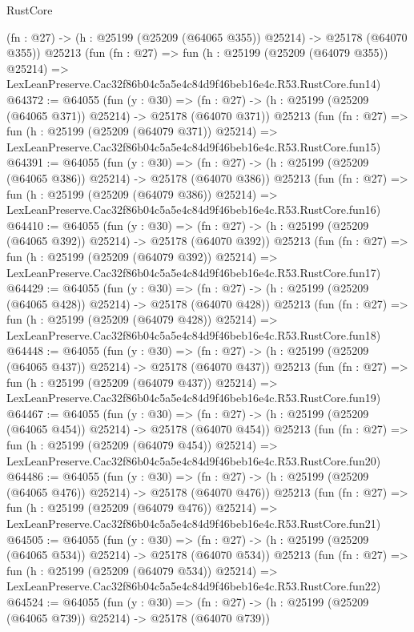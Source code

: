 \begin{lexlean}{RustCore}
\begin{coremodule}
    (fn : @27) -> (h : @25199 (@25209 (@64065 @355)) @25214) -> @25178 (@64070 @355))
    @25213
    (fun (fn : @27) =>
    fun (h : @25199 (@25209 (@64079 @355)) @25214) =>
    LexLeanPreserve.Cac32f86b04c5a5e4c84d9f46beb16e4c.R53.RustCore.fun14)
@64372 := @64055
    (fun (y : @30) =>
    (fn : @27) -> (h : @25199 (@25209 (@64065 @371)) @25214) -> @25178 (@64070 @371))
    @25213
    (fun (fn : @27) =>
    fun (h : @25199 (@25209 (@64079 @371)) @25214) =>
    LexLeanPreserve.Cac32f86b04c5a5e4c84d9f46beb16e4c.R53.RustCore.fun15)
@64391 := @64055
    (fun (y : @30) =>
    (fn : @27) -> (h : @25199 (@25209 (@64065 @386)) @25214) -> @25178 (@64070 @386))
    @25213
    (fun (fn : @27) =>
    fun (h : @25199 (@25209 (@64079 @386)) @25214) =>
    LexLeanPreserve.Cac32f86b04c5a5e4c84d9f46beb16e4c.R53.RustCore.fun16)
@64410 := @64055
    (fun (y : @30) =>
    (fn : @27) -> (h : @25199 (@25209 (@64065 @392)) @25214) -> @25178 (@64070 @392))
    @25213
    (fun (fn : @27) =>
    fun (h : @25199 (@25209 (@64079 @392)) @25214) =>
    LexLeanPreserve.Cac32f86b04c5a5e4c84d9f46beb16e4c.R53.RustCore.fun17)
@64429 := @64055
    (fun (y : @30) =>
    (fn : @27) -> (h : @25199 (@25209 (@64065 @428)) @25214) -> @25178 (@64070 @428))
    @25213
    (fun (fn : @27) =>
    fun (h : @25199 (@25209 (@64079 @428)) @25214) =>
    LexLeanPreserve.Cac32f86b04c5a5e4c84d9f46beb16e4c.R53.RustCore.fun18)
@64448 := @64055
    (fun (y : @30) =>
    (fn : @27) -> (h : @25199 (@25209 (@64065 @437)) @25214) -> @25178 (@64070 @437))
    @25213
    (fun (fn : @27) =>
    fun (h : @25199 (@25209 (@64079 @437)) @25214) =>
    LexLeanPreserve.Cac32f86b04c5a5e4c84d9f46beb16e4c.R53.RustCore.fun19)
@64467 := @64055
    (fun (y : @30) =>
    (fn : @27) -> (h : @25199 (@25209 (@64065 @454)) @25214) -> @25178 (@64070 @454))
    @25213
    (fun (fn : @27) =>
    fun (h : @25199 (@25209 (@64079 @454)) @25214) =>
    LexLeanPreserve.Cac32f86b04c5a5e4c84d9f46beb16e4c.R53.RustCore.fun20)
@64486 := @64055
    (fun (y : @30) =>
    (fn : @27) -> (h : @25199 (@25209 (@64065 @476)) @25214) -> @25178 (@64070 @476))
    @25213
    (fun (fn : @27) =>
    fun (h : @25199 (@25209 (@64079 @476)) @25214) =>
    LexLeanPreserve.Cac32f86b04c5a5e4c84d9f46beb16e4c.R53.RustCore.fun21)
@64505 := @64055
    (fun (y : @30) =>
    (fn : @27) -> (h : @25199 (@25209 (@64065 @534)) @25214) -> @25178 (@64070 @534))
    @25213
    (fun (fn : @27) =>
    fun (h : @25199 (@25209 (@64079 @534)) @25214) =>
    LexLeanPreserve.Cac32f86b04c5a5e4c84d9f46beb16e4c.R53.RustCore.fun22)
@64524 := @64055
    (fun (y : @30) =>
    (fn : @27) -> (h : @25199 (@25209 (@64065 @739)) @25214) -> @25178 (@64070 @739))

\end{coremodule}
\end{lexlean}
